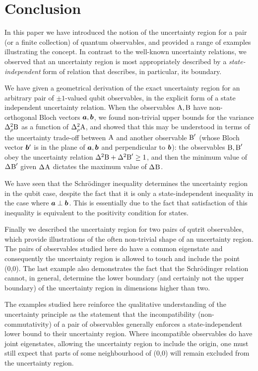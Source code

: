 \section{Conclusion} \label{sec:conclusion}
In this paper we have introduced the notion of the uncertainty region for a pair (or a finite collection) of quantum observables, and provided a range of examples illustrating the concept. In contrast to the well-known uncertainty relations, we observed that an uncertainty region is most appropriately described by a {\em state-independent} form of relation that describes, in particular, its boundary.

We have given a geometrical derivation of the exact uncertainty region for an  arbitrary pair of $\pm1$-valued qubit observables, in the explicit form of a state independent uncertainty relation.  When the observables $\operatorname{A},\operatorname{B}$ have non-orthogonal Bloch vectors $\bm{a},\bm{b}$, we found non-trivial upper bounds for the variance $\varr{\opb}$ as a function of $\varr{\opa}$, and showed that this may be understood in terms of the uncertainty trade-off between $\operatorname{A}$ and another observable $\operatorname{B}'$ (whose Bloch vector $\bm{b}'$ is in the plane of $\bm{a},\bm{b}$ and perpendicular to $\bm{b}$): the observables $\operatorname{B},\operatorname{B}'$ obey the uncertainty relation $\var{\opb}+\var{\opb'}\ge 1$, and then the minimum value of $\sdev{\opb'}$ given $\sdev{\opa}$ dictates the maximum value of $\sdev{\opb}$.

We have seen that the Schr\"odinger inequality determines the uncertainty region in the qubit case, despite the fact that it is only a state-independent inequality in the case where $\bm{a}\perp\bm{b}$. This is essentially due to the fact that satisfaction of this inequality is equivalent to the positivity condition for states.

Finally we described the uncertainty region for two pairs of qutrit observables, which provide illustrations of the often non-trivial shape of an uncertainty region. The pairs of observables studied here do have a common eigenstate and consequently the uncertainty region is allowed to touch and include the point (0,0). The last example also demonstrates the fact that the Schr\"odinger relation cannot, in general, determine the lower boundary (and certainly not the upper boundary) of the uncertainty region in dimensions higher than two.

The examples studied here reinforce the qualitative understanding of  the uncertainty principle  as the statement that the incompatibility (non-commutativity) of a pair of observables generally enforces a state-independent lower bound to their uncertainty region. Where incompatible observables do have joint eigenstates, allowing the uncertainty region to include the origin, one must still expect that parts of some neighbourhood of (0,0) will remain excluded from the uncertainty region. 

